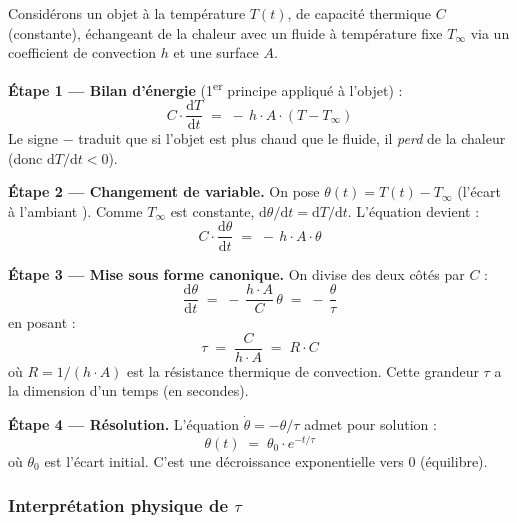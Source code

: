 \documentclass[11pt,a4paper]{article}
\begin{document}
\begin{demo}
Considérons un objet à la température $T(t)$, de capacité thermique $C$ (constante),
échangeant de la chaleur avec un fluide à température fixe $T_\infty$ via un coefficient
de convection $h$ et une surface $A$.

\medskip
\textbf{Étape 1 — Bilan d'énergie} (1\textsuperscript{er} principe appliqué à l'objet) :
\begin{equation}
C \cdot \frac{\mathrm{d}T}{\mathrm{d}t} \;=\; -\,h \cdot A \cdot (T - T_\infty)
\end{equation}
Le signe $-$ traduit que si l'objet est plus chaud que le fluide, il \emph{perd} de la
chaleur (donc $\mathrm{d}T/\mathrm{d}t < 0$).

\medskip
\textbf{Étape 2 — Changement de variable.} On pose $\theta(t) = T(t) - T_\infty$
(\og l'écart à l'ambiant \fg). Comme $T_\infty$ est constante,
$\mathrm{d}\theta/\mathrm{d}t = \mathrm{d}T/\mathrm{d}t$. L'équation devient :
\begin{equation}
C \cdot \frac{\mathrm{d}\theta}{\mathrm{d}t} \;=\; -\,h \cdot A \cdot \theta
\end{equation}

\medskip
\textbf{Étape 3 — Mise sous forme canonique.} On divise des deux côtés par $C$ :
\begin{equation}
\frac{\mathrm{d}\theta}{\mathrm{d}t} \;=\; -\,\frac{h \cdot A}{C}\,\theta \;=\; -\,\frac{\theta}{\tau}
\end{equation}
en posant :
\begin{equation}
\boxed{\;\tau \;=\; \frac{C}{h \cdot A} \;=\; R \cdot C\;}
\label{eq:tau_RC}
\end{equation}
où $R = 1/(h \cdot A)$ est la résistance thermique de convection. Cette grandeur $\tau$ a
la dimension d'un temps (en secondes).

\medskip
\textbf{Étape 4 — Résolution.} L'équation $\dot\theta = -\theta/\tau$ admet pour solution :
\begin{equation}
\boxed{\;\theta(t) \;=\; \theta_0 \cdot e^{-t/\tau}\;}
\end{equation}
où $\theta_0$ est l'écart initial. C'est une décroissance exponentielle vers 0 (équilibre).
\end{demo}

\subsubsection*{Interprétation physique de $\tau$}
\end{document}

